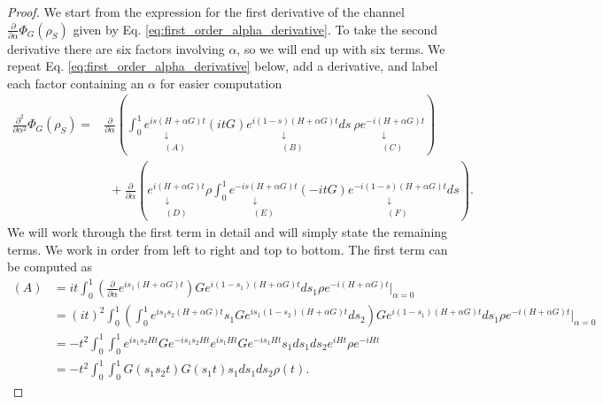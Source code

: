 \documentclass{article}
\newcommand{\parens}[1]{\left( #1 \right)}
\begin{document}
\begin{proof}
We start from the expression for the first derivative of the channel $\frac{\partial}{\partial \alpha} \Phi_G(\rho_S)$ given by Eq. \eqref{eq:first_order_alpha_derivative}. To take the second derivative there are six factors involving $\alpha$, so we will end up with six terms. We repeat Eq. \eqref{eq:first_order_alpha_derivative} below, add a derivative, and label each factor containing an $\alpha$ for easier computation
\begin{align}
    \frac{\partial^2}{\partial \alpha^2} \Phi_G(\rho_S) =& \frac{\partial}{\partial \alpha} \parens{\int_{0}^{1} \underset{\substack{\downarrow \\ (A)}}{e^{i s (H+\alpha G)t}} (i t G) \underset{\substack{\downarrow \\ (B)}}{e^{i (1-s) (H+\alpha G)t}} ds ~ \rho \underset{\substack{\downarrow \\ (C)}}{e^{-i(H+\alpha G)t}} } \nonumber \\
    &~ ~+\frac{\partial}{\partial \alpha} \parens{ \underset{\substack{\downarrow \\ (D)} }{e^{i(H+\alpha G)t}} \rho \int_{0}^1 \underset{\substack{\downarrow \\ (E)} }{e^{-i s (H+\alpha G) t} } (- i t G) \underset{\substack{\downarrow \\ (F)}}{e^{-i (1-s) (H+\alpha G)t}} ds }.
\end{align}
We will work through the first term in detail and will simply state the remaining terms. We work in order from left to right and top to bottom. The first term can be computed as
\begin{align}
    (A) &=i t\int_0^1 \parens{\frac{\partial}{\partial \alpha} e^{i s_1 (H+ \alpha G)t}} G e^{i(1-s_1)(H+\alpha G)t} ds_1 \rho e^{-i (H+\alpha G)t} \bigg|_{\alpha=0} \\
    &= (it)^2 \int_0^1 \parens{\int_0^1 e^{i s_1 s_2 (H+\alpha G)t} s_1 G e^{i s_1 (1-s_2) (H+\alpha G)t} ds_2} G e^{i(1-s_1) (H+\alpha G)t} ds_1 \rho e^{-i(H+\alpha G) t} \bigg|_{\alpha=0} \\
    &= -t^2 \int_0^1 \int_0^1 e^{i s_1 s_2 H t} G e^{-i s_1 s_2 H t} e^{i s_1 H t} G e^{-i s_1 H t} s_1 ds_1 ds_2 e^{i H t} \rho e^{-i H t} \\
    &= -t^2 \int_0^1 \int_0^1 G(s_1 s_2 t) G(s_1 t) s_1 ds_1 ds_2 \rho(t). \label{eq:second_deriv_alpha_first_term}
\end{align}


\end{proof}
\end{document}
